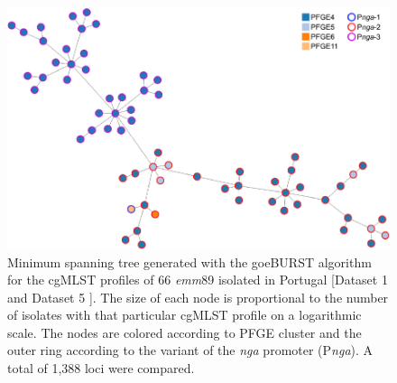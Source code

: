 \newpage
\begin{figure}[h!]
    \centering
    \includegraphics[angle=0,width=\textwidth]{figures/chapter 4/FigureS16.pdf}
    \caption[Minimum spanning tree generated with the goeBURST algorithm for the cgMLST profiles of 66 \textit{emm}89 isolated in Portugal.]{Minimum spanning tree generated with the goeBURST algorithm for the \ac{cgMLST} profiles of 66 \textit{emm}89 isolated in Portugal [Dataset 1 and Dataset 5 \cite{friaes_supplemental_2023}]. The size of each node is proportional to the number of isolates with that particular \ac{cgMLST} profile on a logarithmic scale. The nodes are colored according to \ac{PFGE} cluster and the outer ring according to the variant of the \textit{nga} promoter (P\textit{nga}). A total of 1,388 loci were compared.}
    \label{fig:chap4_figureS16}
\end{figure}

